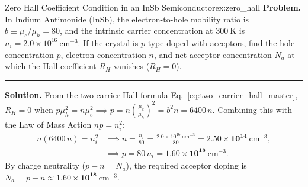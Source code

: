 \documentclass[11pt,a4paper]{article}
\begin{document}
\begin{examplebox}{Zero Hall Coefficient Condition in an InSb Semiconductor}{ex:zero_hall}
\textbf{Problem.} In Indium Antimonide ($\text{InSb}$), the electron-to-hole mobility ratio is $b \equiv \mu_e/\mu_h = 80$, and the intrinsic carrier concentration at $300\ \mathrm{K}$ is $n_i = 2.0\times 10^{16}\ \mathrm{cm^{-3}}$. If the crystal is $p$-type doped with acceptors, find the hole concentration $p$, electron concentration $n$, and net acceptor concentration $N_a$ at which the Hall coefficient $R_H$ vanishes ($R_H = 0$).
\vspace{0.2cm}\hrule\vspace{0.2cm}
\textbf{Solution.}
From the two-carrier Hall formula Eq.~\eqref{eq:two_carrier_hall_master}, $R_H = 0$ when $p\mu_h^2 = n\mu_e^2 \implies p = n\left(\frac{\mu_e}{\mu_h}\right)^2 = b^2 n = 6400\,n$. Combining this with the Law of Mass Action $np = n_i^2$:
\begin{align*}
    n(6400\,n) = n_i^2 &\implies n = \frac{n_i}{80} = \frac{2.0\times 10^{16}\ \mathrm{cm^{-3}}}{80} = \mathbf{2.50\times 10^{14}\ \mathrm{cm^{-3}}}, \\
    &\implies p = 80\,n_i = \mathbf{1.60\times 10^{18}\ \mathrm{cm^{-3}}}.
\end{align*}
By charge neutrality ($p - n = N_a$), the required acceptor doping is $N_a = p - n \approx \mathbf{1.60\times 10^{18}\ \mathrm{cm^{-3}}}$.
\end{examplebox}
\end{document}
